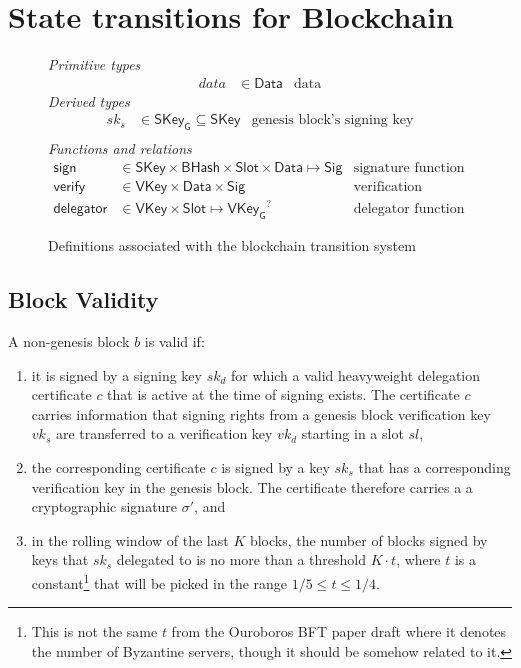 \documentclass[11pt,a4paper]{article}
\newcommand{\var}[1]{\mathit{#1}}
\newcommand{\fun}[1]{\mathsf{#1}}
\newcommand{\type}[1]{\mathsf{#1}}
\newcommand{\BHash}{\type{BHash}}  %
\newcommand{\Slot}{\type{Slot}}
\newcommand{\SKey}{\type{SKey}}
\newcommand{\SKeyGen}{\type{SKey_G}}
\newcommand{\VKey}{\type{VKey}}
\newcommand{\VKeyGen}{\type{VKey_G}}
\newcommand{\Sig}{\type{Sig}}
\newcommand{\Data}{\type{Data}}
\newcommand{\signname}{sign}
\newcommand{\verifyname}{verify}
\newcommand{\delegatorname}{delegator} %
\newcommand{\partialf}{\mapsto}
\begin{document}
\section{State transitions for Blockchain}
\label{sec:state-trans-chain}

\begin{figure}[h]
  \emph{Primitive types}
  \begin{align*}
  data & \in \Data    & \text{data}
  \end{align*}
  \emph{Derived types}
  \begin{align*}
    sk_s & \in \SKeyGen \subseteq \SKey & \text{genesis block's signing key}\\
  \end{align*}
  \emph{Functions and relations}
  \begin{align*}
    \fun{\signname} & \in \SKey \times \BHash \times \Slot \times \Data \partialf \Sig
      & \text{signature function}\\
    \fun{\verifyname} & \in \VKey \times \Data \times \Sig
      & \text{verification relation}\\
    \fun{\delegatorname} & \in \VKey \times \Slot \partialf \VKeyGen^?
      & \text{delegator function}
  \end{align*}
  \caption{Definitions associated with the blockchain transition system}
  \label{fig:state-trans-abstract}
\end{figure}


\subsection{Block Validity}
\label{sec:block-valid}

A non-genesis block $\var{b}$ is valid if:
%
\begin{enumerate}
\item it is signed by a signing key $sk_d$ for which a valid heavyweight
  delegation certificate $c$ that is active at the time of signing exists.
  The certificate $c$ carries information that signing rights from a genesis
  block verification key $vk_s$ are transferred to a verification key $vk_d$
  starting in a slot $sl$,
\item the corresponding certificate $c$ is signed by a key $sk_s$ that has a
  corresponding verification key in the genesis block.
  The certificate therefore carries a a cryptographic signature $\sigma'$,
  and
\item in the rolling window of the last $K$ blocks, the number of blocks
  signed by keys that $sk_s$ delegated to is no more than a threshold
  $K \cdot t$, where $t$ is a constant\footnote{This is not the same $t$ from
    the Ouroboros BFT paper draft where it denotes the number of Byzantine
    servers, though it should be somehow related to it.}  that will be picked
  in the range $1/5 \leq t \leq 1/4$.
\end{enumerate}
\end{document}
